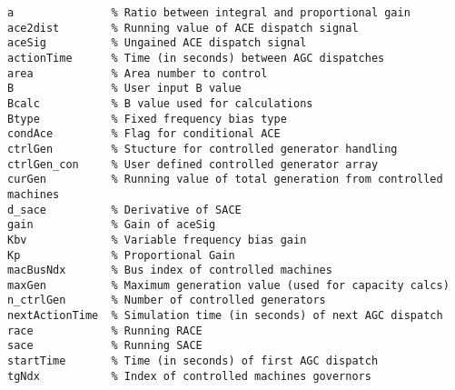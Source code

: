 \begin{lstlisting}[caption={AGC Global Field Variables},label={lst: agc g}]
\end{lstlisting}\vspace{-2 em}
\begin{verbatim}
a               % Ratio between integral and proportional gain
ace2dist        % Running value of ACE dispatch signal
aceSig          % Ungained ACE dispatch signal
actionTime      % Time (in seconds) between AGC dispatches
area            % Area number to control
B               % User input B value
Bcalc           % B value used for calculations
Btype           % Fixed frequency bias type
condAce         % Flag for conditional ACE
ctrlGen         % Stucture for controlled generator handling
ctrlGen_con     % User defined controlled generator array
curGen          % Running value of total generation from controlled machines
d_sace          % Derivative of SACE
gain            % Gain of aceSig
Kbv             % Variable frequency bias gain
Kp              % Proportional Gain
macBusNdx       % Bus index of controlled machines
maxGen          % Maximum generation value (used for capacity calcs)
n_ctrlGen       % Number of controlled generators
nextActionTime  % Simulation time (in seconds) of next AGC dispatch
race            % Running RACE
sace            % Running SACE
startTime       % Time (in seconds) of first AGC dispatch
tgNdx           % Index of controlled machines governors
\end{verbatim}


